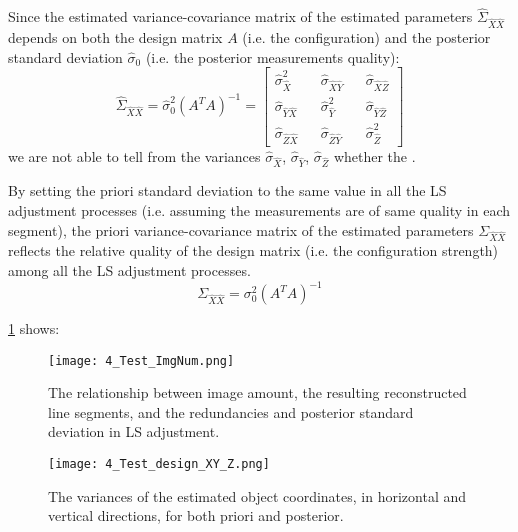 Since the estimated variance-covariance matrix of the estimated parameters $\hat{\Sigma}_{\hat{X}\hat{X}}$ depends on both the design matrix $A$ (i.e. the configuration) and the posterior standard deviation $\hat{\sigma}_0$ (i.e. the posterior measurements quality):
\begin{equation}
\hat{\Sigma}_{\hat{X}\hat{X}}=\hat{\sigma}_0^2(A^TA)^{-1}=
\begin{bmatrix}
\hat{\sigma}_{\hat{X}}^2 && \hat{\sigma}_{\hat{X}\hat{Y}} && \hat{\sigma}_{\hat{X}\hat{Z}} \\
\hat{\sigma}_{\hat{Y}\hat{X}} && \hat{\sigma}_{\hat{Y}}^2 && \hat{\sigma}_{\hat{Y}\hat{Z}} \\
\hat{\sigma}_{\hat{Z}\hat{X}} && \hat{\sigma}_{\hat{Z}\hat{Y}} && \hat{\sigma}_{\hat{Z}}^2
\end{bmatrix}
\end{equation}
we are not able to tell from the variances $\hat{\sigma}_{\hat{X}}$, $\hat{\sigma}_{\hat{Y}}$, $\hat{\sigma}_{\hat{Z}}$ whether the .

By setting the priori standard deviation to the same value in all the LS adjustment processes (i.e. assuming the measurements are of same quality in each segment), the priori variance-covariance matrix of the estimated parameters $\Sigma_{\hat{X}\hat{X}}$ reflects the relative quality of the design matrix (i.e. the configuration strength) among all the LS adjustment processes.
\begin{equation}
\Sigma_{\hat{X}\hat{X}}=\sigma_0^2(A^TA)^{-1}
\end{equation}

\cref{fig:TestdesignHV_1} shows:


\begin{figure}
  \centering
  \texttt{[image: 4\_Test\_ImgNum.png]} %
  \caption{\small The relationship between image amount, the resulting reconstructed line segments, and the redundancies and posterior standard deviation in LS adjustment.}
  \label{fig:TestImgNum_1}
  \vspace{1cm}
  \texttt{[image: 4\_Test\_design\_XY\_Z.png]} %
  \caption{\small The variances of the estimated object coordinates, in horizontal and vertical directions, for both priori and posterior.}
  \label{fig:TestdesignHV_1}
\end{figure}


\clearpage





